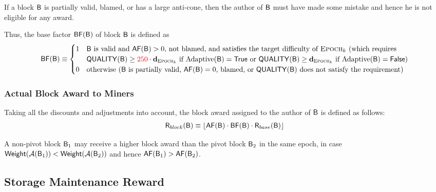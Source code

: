 	If a block $\textsf{B}$ is partially valid, blamed, or has a large anti-cone, then the author of $\textsf{B}$ must have made some mistake and hence he is not eligible for any award.


Thus, the base factor $\mathsf{BF}(\textsf{B})$ of block $\textsf{B}$ is defined as
\begin{align}\label{eq:basef}
	\mathsf{BF}(\textsf{B})\equiv \begin{cases}
		1 & \mbox{$\textsf{B}$ is valid and $\mathsf{AF}(\textsf{B})>0$, {not blamed, and satisfies the target difficulty of $\textsc{Epoch}_k$ (which requires  }}\\
		~ & \mbox{{$\mathsf{QUALITY}(\textsf{B})\ge {\color{red}250} \cdot \mathbf{d}_{\textsc{Epoch}_k}$ if $\mathrm{Adaptive}(\textsf{B})=\mathsf{True}$ or $\mathsf{QUALITY}(\textsf{B})\ge \mathbf{d}_{\textsc{Epoch}_k}$ if $\mathrm{Adaptive}(\textsf{B})=\mathsf{False}$)}}\\
		0 & \mbox{otherwise ($\textsf{B}$ is partially valid, {$\mathsf{AF}(\textsf{B})=0$, blamed}, or $\mathsf{QUALITY}(\textsf{B})$ does not satisfy the requirement)} 
	\end{cases}
\end{align}

\subsubsection{Actual Block Award to Miners}
	\label{subsubsec:actualblockaward}
	Taking all the discounts and adjustments into account,
	the block award assigned to the author of $\textsf{B}$ is defined as follows:
	\begin{align}
		\textsf{R}_{block}(\textsf{B}) \equiv \left\lfloor\mathsf{AF}(\textsf{B})\cdot \mathsf{BF}(\textsf{B})
		\cdot \textsf{R}_{base}(\textsf{B})\right\rfloor
	\end{align}


	A non-pivot block $\textsf{B}_1$ may receive a higher block award than the pivot block $\textsf{B}_2$ 
	in the same epoch,
	in case $\mathsf{Weight}(\mathcal{A}(\textsf{B}_1))<\mathsf{Weight}(\mathcal{A}(\textsf{B}_2))$ 
	and hence $\mathsf{AF}(\textsf{B}_1)>\mathsf{AF}(\textsf{B}_2)$.




	\subsection{Storage Maintenance Reward}
	\label{subsec:storagefee}


